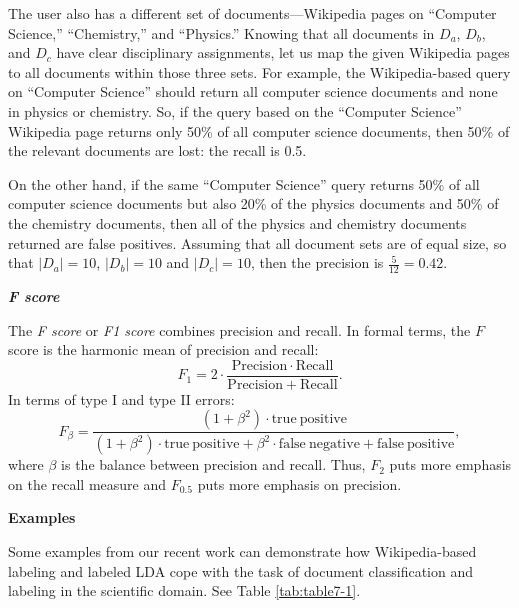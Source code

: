 \documentclass[]{krantz}
\begin{document}
The user also has a different set of documents---Wikipedia pages on
``Computer Science,'' ``Chemistry,'' and ``Physics.'' Knowing that all
documents in \(D_a\), \(D_b\), and \(D_c\) have clear disciplinary
assignments, let us map the given Wikipedia pages to all documents
within those three sets. For example, the Wikipedia-based query on
``Computer Science'' should return all computer science documents and
none in physics or chemistry. So, if the query based on the ``Computer
Science'' Wikipedia page returns only 50\% of all computer science
documents, then 50\% of the relevant documents are lost: the recall is
0.5.

On the other hand, if the same ``Computer Science'' query returns 50\%
of all computer science documents but also 20\% of the physics documents
and 50\% of the chemistry documents, then all of the physics and
chemistry documents returned are false positives. Assuming that all
document sets are of equal size, so that \(|D_a| = 10\), \(|D_b|=10\)
and \(|D_c| = 10\), then the precision is \(\frac{5}{12} = 0.42\).

\textbf{\emph{F score}}

The \emph{F score} or \emph{F1 score} combines precision and recall. In
formal terms, the \(F\) score is the harmonic mean of precision and
recall: \[\label{eq:text:F1}
F_1 = 2\cdot \frac{\mathrm{Precision}\cdot \mathrm{Recall}}{\mathrm{Precision}+\mathrm{Recall}}.\]
In terms of type I and type II errors:
\[F_\beta = \frac{(1+\beta^2)\cdot \mathrm{true\ positive}}{(1+\beta^2)\cdot \mathrm{true\ positive} + \beta^2\cdot \mathrm{false\ negative} + \mathrm{false\ positive}},\]
where \(\beta\) is the balance between precision and recall. Thus,
\(F_2\) puts more emphasis on the recall measure and \(F_{0.5}\) puts
more emphasis on precision.

\textbf{Examples}

Some examples from our recent work can demonstrate how Wikipedia-based
labeling and labeled LDA
\citep{ramage-09, Nguyen:Boyd-Graber:Resnik:Chang-2014} cope with the
task of document classification and labeling in the scientific domain.
See Table \ref{tab:table7-1}.
\end{document}
